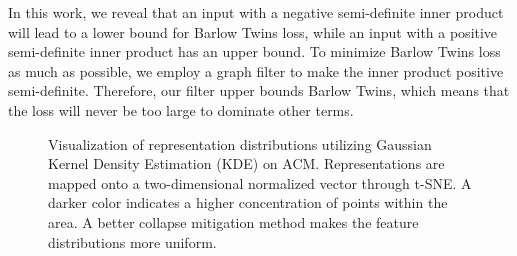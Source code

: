\documentclass[letterpaper]{article} %
\begin{document}
In this work, we reveal that an input with a negative semi-definite inner product will lead to a lower bound for Barlow Twins loss, while an input with a positive semi-definite inner product has an upper bound. To minimize Barlow Twins loss as much as possible, we employ a graph filter to make the inner product positive semi-definite. Therefore, our filter upper bounds Barlow Twins, which means that the loss will never be too large to dominate other terms.

\begin{figure}[htb]
\centering
{}
\caption{Visualization of representation distributions utilizing Gaussian Kernel Density Estimation (KDE) \cite{botev2010kernel} on ACM. Representations are mapped onto a two-dimensional normalized vector through t-SNE. A darker color indicates a higher concentration of points within the area. %
A better collapse mitigation method makes the feature distributions more uniform.}
\label{collapse}
\end{figure}
\end{document}
